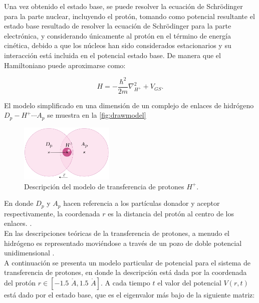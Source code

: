 Una vez obtenido el estado base, se puede resolver la ecuación de Schrödinger para la parte nuclear, incluyendo el protón, tomando como potencial resultante el estado base resultado de resolver la ecuación de Schrödinger para la parte electrónica, y considerando únicamente al protón en el término de energía cinética, debido a que los núcleos han sido considerados estacionarios y su interacción está incluida en el potencial estado base. De manera que el Hamiltoniano puede aproximarse como:

\begin{equation}
  \label{eq:hamApprox}
  H = -\frac{\hbar^2}{2m}\nabla^2_{H^+} + V_{GS}.
\end{equation}

El modelo simplificado en una dimensión de un complejo de enlaces de hidrógeno $D_p-H^+\dotsb A_p$ se muestra en la \autoref{fig:drawmodel}

\begin{figure}[ht]
  \centering
\includegraphics[width=0.4\textwidth]{./img/DrawModel1.png}
\caption{Descripción del modelo de transferencia de protones $H^+$.}
\label{fig:drawmodel}
\end{figure}

En donde $D_p$ y $A_p$ hacen referencia a los partículas donador y aceptor respectivamente, la coordenada $r$ es la distancia del protón al centro de los enlaces. \cite{DynamicalTheoryPTS}. \\
En las descripciones teóricas de la transferencia de protones, a menudo el hidrógeno es representado moviéndose a través de un pozo de doble potencial unidimensional \cite{Enzymes, Krishtalik2000}. 
\\

A continuación se presenta un modelo particular de potencial para el sistema de transferencia de protones, en donde la descripción está dada por la coordenada del protón $r \in [-1.5 \,\,\mathring{A}, 1.5 \,\,\mathring{A}]$.
A cada tiempo $t$ el valor del potencial $V(r,t)$ está dado por el estado base, que es el eigenvalor más bajo de la siguiente matriz:

